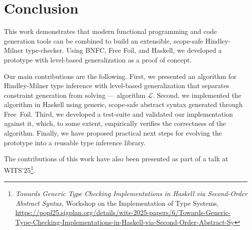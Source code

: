 \chapter{Conclusion}
\label{chap:conclusion}

This work demonstrates that modern functional programming and code generation tools can be combined to build an extensible, scope-safe Hindley-Milner type-checker. Using BNFC, Free Foil, and Haskell, we developed a prototype with level-based generalization as a proof of concept.

Our main contributions are the following. First, we presented an algorithm for Hindley-Milner type inference with level-based generalization that separates constraint generation from solving — algorithm $\mathcal{L}$. Second, we implemented the algorithm in Haskell using generic, scope-safe abstract syntax generated through Free~Foil. Third, we developed a test-suite and validated our implementation against it, which, to some extent, empirically verifies the correctness of the algorithm. Finally, we have proposed practical next steps for evolving the prototype into a reusable type inference library.

The contributions of this work have also been presented as part of a talk at WITS'25\footnote{\textit{Towards Generic Type Checking Implementations in Haskell via Second-Order Abstract Syntax}, Workshop on the Implementation of Type Systems, \url{https://popl25.sigplan.org/details/wits-2025-papers/6/Towards-Generic-Type-Checking-Implementations-in-Haskell-via-Second-Order-Abstract-Sy}}.
